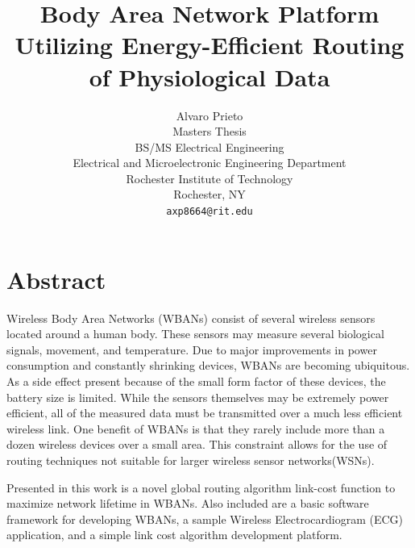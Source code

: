 \documentclass{article}
\begin{document}
\title{Body Area Network Platform Utilizing Energy-Efficient Routing of Physiological Data}
\author{Alvaro Prieto\\
Masters Thesis\\
BS/MS Electrical Engineering\\
Electrical and Microelectronic Engineering Department\\
Rochester Institute of Technology\\
Rochester, NY\\
\texttt{axp8664@rit.edu}}

\maketitle
\thispagestyle{empty}

\pagebreak

\tableofcontents

\pagebreak

\section*{Abstract}
Wireless Body Area Networks (WBANs) consist of several wireless sensors located around a human body. These sensors may measure several biological signals, movement, and temperature. Due to major improvements in power consumption and constantly shrinking devices, WBANs are becoming ubiquitous. As a side effect present because of the small form factor of these devices, the battery size is limited. While the sensors themselves may be extremely power efficient, all of the measured data must be transmitted over a much less efficient wireless link. One benefit of WBANs is that they rarely include more than a dozen wireless devices over a small area. This constraint allows for the use of routing techniques not suitable for larger wireless sensor networks(WSNs).

Presented in this work is a novel global routing algorithm link-cost function to maximize network lifetime in WBANs. Also included are a basic software framework for developing WBANs, a sample Wireless Electrocardiogram (ECG) application, and a simple link cost algorithm development platform.

\pagebreak

\listoffigures
\end{document}
